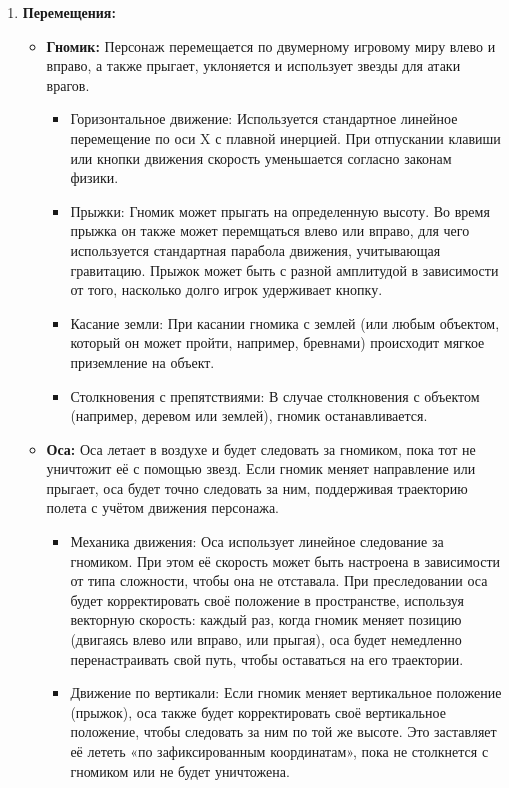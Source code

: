 \documentclass{article}
\begin{document}
\begin{enumerate}
  \item \textbf{Перемещения:} 
    \begin{itemize}
      \item \textbf{Гномик:} Персонаж перемещается по двумерному игровому миру влево и вправо, а также прыгает, уклоняется и использует звезды для атаки врагов.
      \begin{itemize}
        \item Горизонтальное движение: Используется стандартное линейное перемещение по оси X с плавной инерцией. При отпускании клавиши или кнопки движения скорость уменьшается согласно законам физики.
            \item Прыжки: Гномик может прыгать на определенную высоту. Во время прыжка он также может перемщаться влево или вправо, для чего используется стандартная парабола движения, учитывающая гравитацию. Прыжок может быть с разной амплитудой в зависимости от того, насколько долго игрок удерживает кнопку.
            \item Касание земли: При касании гномика с землей (или любым объектом, который он может пройти, например, бревнами) происходит мягкое приземление на объект.
            \item Столкновения с препятствиями: В случае столкновения с объектом (например, деревом или землей), гномик останавливается.
      \end{itemize}
      \item \textbf{Оса:} Оса летает в воздухе и будет следовать за гномиком, пока тот не уничтожит её с помощью звезд. Если гномик меняет направление или прыгает, оса будет точно следовать за ним, поддерживая траекторию полета с учётом движения персонажа.
      \begin{itemize}
        \item Механика движения:
Оса использует линейное следование за гномиком. При этом её скорость может быть настроена в зависимости от типа сложности, чтобы она не отставала.
При преследовании оса будет корректировать своё положение в пространстве, используя векторную скорость: каждый раз, когда гномик меняет позицию (двигаясь влево или вправо, или прыгая), оса будет немедленно перенастраивать свой путь, чтобы оставаться на его траектории. 
        \item Движение по вертикали: Если гномик меняет вертикальное положение (прыжок), оса также будет корректировать своё вертикальное положение, чтобы следовать за ним по той же высоте. Это заставляет её лететь «по зафиксированным координатам», пока не столкнется с гномиком или не будет уничтожена.

\end{itemize}
\end{itemize}
\end{enumerate}
\end{document}
